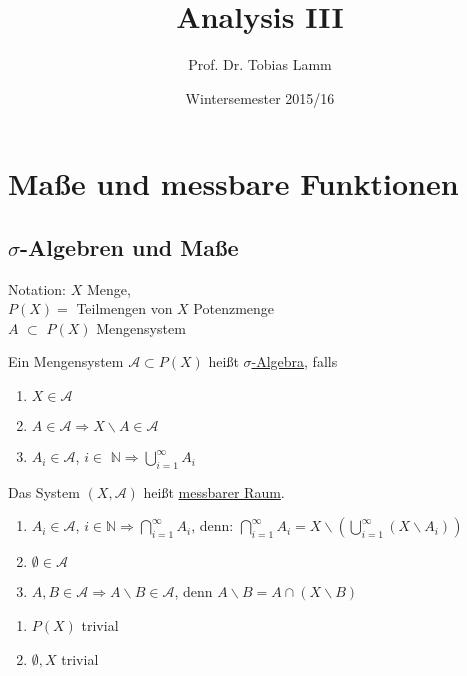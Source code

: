 \documentclass[11pt]{memoir}
\begin{document}
\title{Analysis III}
\author{Prof. Dr. Tobias Lamm}
\date{Wintersemester 2015/16}

\maketitle

\chapter{Maße und messbare Funktionen}
\section{$\sigma$-Algebren und Maße}
Notation: $X$ Menge, \\ $P(X) =$ \textbraceleft Teilmengen von $X$\textbraceright  {} Potenzmenge \\
$A$ $\subset$  $P(X)$ Mengensystem
\begin{Definition}
Ein Mengensystem $\mathscr{A} \subset P(X)$ heißt \underline{$\sigma$-Algebra}, falls
\begin{enumerate}
	\item $X \in \mathscr{A}$
	\item $A \in \mathscr{A} \Rightarrow X \backslash A \in \mathscr{A}$
	\item $A_i \in \mathscr{A}$, $i \in$ $\mathbb{N} \Rightarrow \bigcup_{i = 1}^{\infty} A_i$
\end{enumerate}
Das System $(X, \mathscr{A})$ heißt \underline{messbarer Raum}.
\end{Definition}

\begin{Bemerkung}
\begin{enumerate}
	\item $A_i \in \mathscr{A}$, $i \in \mathbb{N} \Rightarrow \bigcap_{i = 1}^{\infty} A_i$, denn:
	$\bigcap_{i=1}^{\infty} A_i = X\backslash (\bigcup_{i=1}^{\infty} (X \backslash A_i))$
	\item $\emptyset \in \mathscr{A}$
	\item $A, B \in \mathscr{A} \Rightarrow A \backslash B \in \mathscr{A}$, denn $A \backslash B = A \cap (X \backslash B)$
\end{enumerate}
\end{Bemerkung}

\begin{Beispiel}
\begin{enumerate}
	\item $P(X)$ trivial
	\item \textbraceleft$ \emptyset, X $\textbraceright{} trivial
\end{enumerate}
\end{Beispiel}
\end{document}
